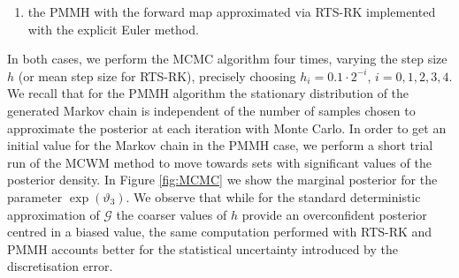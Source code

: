 \documentclass{siamart1116}
\numberwithin{theorem}{section}
\renewcommand{\theta}{\vartheta}
\begin{document}
{\begin{enumerate}
	 \item the PMMH with the forward map approximated via RTS-RK implemented with the explicit Euler method.
\end{enumerate}
In both cases, we perform the MCMC algorithm four times, varying the step size $h$ (or mean step size for RTS-RK), precisely choosing $h_i = 0.1\cdot2^{-i}$, $i = 0, 1, 2, 3, 4$. We recall that for the PMMH algorithm the stationary distribution of the generated Markov chain is independent of the number of samples chosen to approximate the posterior at each iteration with Monte Carlo. In order to get an initial value for the Markov chain in the PMMH case, we perform a short trial run of the MCWM method to move towards sets with significant values of the posterior density. In Figure \ref{fig:MCMC} we show the marginal posterior for the parameter $\exp(\theta_3)$. We observe that while for the standard deterministic approximation of $\mathcal{G}$ the coarser values of $h$ provide an overconfident posterior centred in a biased value, the same computation performed with RTS-RK and PMMH accounts better for the statistical uncertainty introduced by the discretisation error.

}
\end{document}
